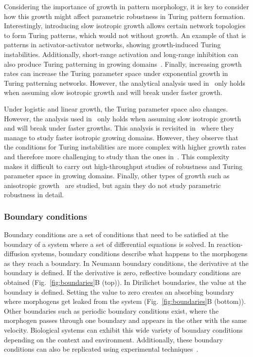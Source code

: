 Considering the importance of growth in pattern morphology, it is key to consider how this growth might affect parametric robustness in Turing pattern formation.
Interestingly, introducing slow isotropic growth allows certain network topologies to form Turing patterns, which would not without growth.
An example of that is patterns in activator-activator networks, showing growth-induced Turing instabilities.
Additionally, short-range activation and long-range inhibition can also produce Turing patterning in growing domains~\parencite{gaffney2010}.
Finally, increasing growth rates can increase the Turing parameter space under exponential growth in Turing patterning networks.
However, the analytical analysis used in~\cite{gaffney2010} only holds when assuming slow isotropic growth and will break under faster growth.

Under logistic and linear growth, the Turing parameter space also changes.
However, the analysis used in~\cite{gaffney2010} only holds when assuming slow isotropic growth and will break under faster growths.
This analysis is revisited in~\cite{Klika2017} where they manage to study faster isotropic growing domains.
However, they observe that the conditions for Turing instabilities are more complex with higher growth rates and therefore more challenging to study than the ones in~\cite{gaffney2010}.
This complexity makes it difficult to carry out high-throughput studies of robustness and Turing parameter space in growing domains.
Finally, other types of growth such as anisotropic growth~\parencite{Krause2019} are studied, but again they do not study parametric robustness in detail.

\subsubsection{Boundary conditions}\label{boundary_conditions_intro}
Boundary conditions are a set of conditions that need to be satisfied at the boundary of a system where a set of differential equations is solved.
In reaction-diffusion systems, boundary conditions describe what happens to the morphogens as they reach a boundary.
In Neumann boundary conditions, the derivative at the boundary is defined.
If the derivative is zero, reflective boundary conditions are obtained (Fig.~\ref{fig:boundaries}B (top)).
In Dirilichet boundaries, the value at the boundary is defined.
Setting the value to zero creates an absorbing boundary where morphogens get leaked from the system (Fig.~\ref{fig:boundaries}B (bottom)).
Other boundaries such as periodic boundary conditions exist, where the morphogen passes through one boundary and appears in the other with the same velocity.
Biological systems can exhibit this wide variety of boundary conditions depending on the context and environment.
Additionally, these boundary conditions can also be replicated using experimental techniques~\parencite{Krause2020, Sheth2012, Vahey2014}.

